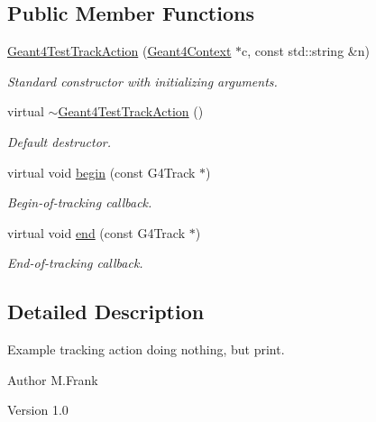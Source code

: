 \subsection*{Public Member Functions}
\begin{DoxyCompactItemize}
\item 
\hyperlink{class_d_d4hep_1_1_simulation_1_1_test_1_1_geant4_test_track_action_a5dcd49bcdb620730e97cb2f6b3c3cd0d}{Geant4TestTrackAction} (\hyperlink{class_d_d4hep_1_1_simulation_1_1_geant4_context}{Geant4Context} $\ast$c, const std::string \&n)
\begin{DoxyCompactList}\small\item\em Standard constructor with initializing arguments. \item\end{DoxyCompactList}\item 
virtual \hyperlink{class_d_d4hep_1_1_simulation_1_1_test_1_1_geant4_test_track_action_aede90b2245482e02e82e959b30a1e2df}{$\sim$Geant4TestTrackAction} ()
\begin{DoxyCompactList}\small\item\em Default destructor. \item\end{DoxyCompactList}\item 
virtual void \hyperlink{class_d_d4hep_1_1_simulation_1_1_test_1_1_geant4_test_track_action_a461ee9be4bf51bcfac397d093fb55fb8}{begin} (const G4Track $\ast$)
\begin{DoxyCompactList}\small\item\em Begin-\/of-\/tracking callback. \item\end{DoxyCompactList}\item 
virtual void \hyperlink{class_d_d4hep_1_1_simulation_1_1_test_1_1_geant4_test_track_action_a41bc0c1912089342579388ae2c176c69}{end} (const G4Track $\ast$)
\begin{DoxyCompactList}\small\item\em End-\/of-\/tracking callback. \item\end{DoxyCompactList}\end{DoxyCompactItemize}


\subsection{Detailed Description}
Example tracking action doing nothing, but print. \begin{DoxyAuthor}{Author}
M.Frank 
\end{DoxyAuthor}
\begin{DoxyVersion}{Version}
1.0 
\end{DoxyVersion}


